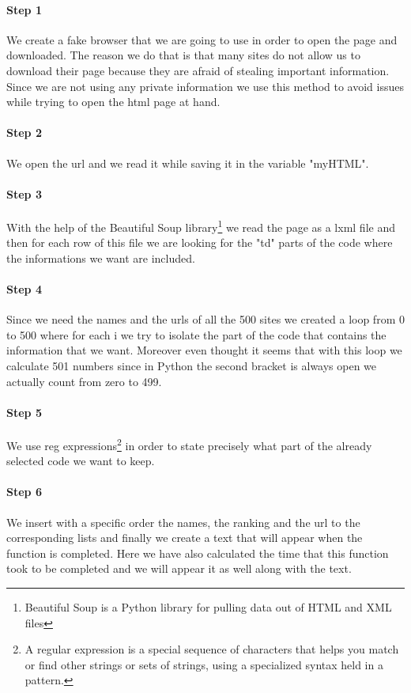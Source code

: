 \documentclass{article}
\begin{document}
\paragraph{Step 1} We create a fake browser that we are going to use in order to open the page and downloaded. The reason we do that is that many sites do not allow us to download their page because they are afraid of stealing important information. Since we are not using any private information we use this method to avoid issues while trying to open the html page at hand.    
\paragraph{Step 2} We open the url and we read it while saving it in the variable "myHTML".
\paragraph{Step 3} With the help of the Beautiful Soup library\footnote{Beautiful Soup is a Python library for pulling data out of HTML and XML files} we read the page as a lxml file and then for each row of this file we are looking for the "td" parts of the code where the informations we want are included.
\paragraph{Step 4} Since we need the names and the urls of all the 500 sites we created a loop from 0 to 500 where for each i we try to isolate the part of the code that contains the information that we want. Moreover even thought it seems that with this loop we calculate 501 numbers since in Python the second bracket is always open we actually count from zero to 499.
\paragraph{Step 5} We use reg expressions\footnote{A regular expression is a special sequence of characters that helps you match or find other strings or sets of strings, using a specialized syntax held in a pattern.} in order to state precisely what part of the already selected code we want to keep.
\paragraph{Step 6} We insert with a specific order the names, the ranking and the url to the corresponding lists and finally we create a text that will appear when the function is completed. Here we have also calculated the time that this function took to be completed and we will appear it as well along with the text.
\end{document}
